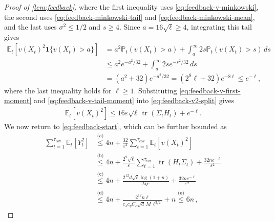 \documentclass[11pt]{article}
\newcommand{\E}{\mathbb E}
\newcommand{\Pp}{\mathbb P}
\newcommand{\tr}{\operatorname{tr}}
\newcommand{\1}{\mathbf 1}
\newcommand{\eps}{\varepsilon}
\begin{document}
\begin{proof}[Proof of \cref{lem:feedback}]
    where the first inequality uses \eqref{eq:feedback-v-minkowski},
    the second uses \eqref{eq:feedback-minkowski-tail} and
    \eqref{eq:feedback-minkowski-mean}, and the last uses $\sigma^2\leq1/2$ and $s\geq4$.
    Since $a=16\sqrt\ell\geq4$, integrating this tail gives
    \begin{align}
        \E_t\left[
            v(X_t)^2\1\{v(X_t)>a\}
            \right]
         & =
        a^2\Pp_t(v(X_t)>a)
        +
        \int_a^\infty
        2s\Pp_t(v(X_t)>s)\,ds
        \nonumber \\
         & \leq
        a^2e^{-a^2/32}
        +
        \int_a^\infty2se^{-s^2/32}\,ds
        \nonumber \\
         & =
        (a^2+32)e^{-a^2/32}
        =
        (2^8\ell+32)e^{-8\ell}
        \leq
        e^{-\ell},
        \label{eq:feedback-v-tail-moment}
    \end{align}
    where the last inequality holds for $\ell\geq1$.
    Substituting
    \eqref{eq:feedback-v-first-moment} and
    \eqref{eq:feedback-v-tail-moment} into
    \eqref{eq:feedback-v2-split} gives
    \begin{align}
        \E_t[v(X_t)^2]
        \leq
        16\eps\sqrt\ell\,
        \tr(\Sigma_tH_t)
        +
        e^{-\ell}.
        \label{eq:feedback-v2}
    \end{align}
    We now return to \eqref{eq:feedback-start}, which can be further bounded as
    \begin{align}
        \sum_{t=1}^{\tau_{\mathrm{cov}}}\E_t[Y_t^2]
         & \stackrel{\texttt{(a)}}{\leq}
        4n
        +
        \frac{32}{\eps^2}
        \sum_{t=1}^{\tau_{\mathrm{cov}}}
        \E_t[v(X_t)^2]
        \\
         & \stackrel{\texttt{(b)}}{\leq}
        4n
        +
        \frac{2^9\sqrt\ell}{\eps}
        \sum_{t=1}^{\tau_{\mathrm{cov}}}
        \tr(H_t\Sigma_t)
        +
        \frac{32ne^{-\ell}}{\eps^2}
        \\
         & \stackrel{\texttt{(c)}}{\leq}
        4n
        +
        \frac{2^{12}d\sqrt\ell\log(1+n)}
        {\lambda\eta\eps}
        +
        \frac{32ne^{-\ell}}{\eps^2}
        \\
         & \stackrel{\texttt{(d)}}{\leq}
        4n
        +
        \frac{2^{12}n\ell}
        {c_\lambda c_\eta C_\eps \sqrt d\,M\,\ell^{3/2}}
        +
        n
        \stackrel{\texttt{(e)}}{\leq}
        6n
        \,,
        \label{eq:feedback-predictable-before-parameters}
    \end{align}

\end{proof}
\end{document}
